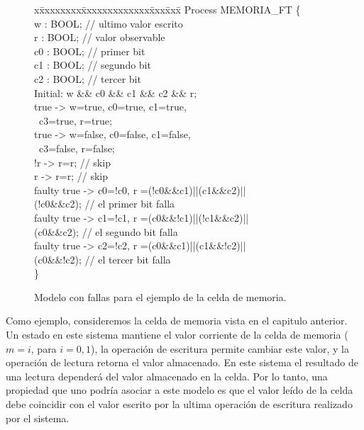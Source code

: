 \begin{figure}[t]
\centering
\begin{minipage}[t]{.47\textwidth}
\fontsize{10}{10}\selectfont\ttfamily
\begin{tabbing}
x\=xxxxxxxx\=xxxxxxxxxxxxx\=xxx\=xxx\= \kill    
Process MEMORIA\_FT \{\\[1ex]
\>w : BOOL; // ultimo valor escrito \\
\>r : BOOL; // valor observable \\
\>c0 : BOOL; // primer bit \\
\>c1 : BOOL; // segundo bit \\
\>c2 : BOOL; // tercer bit \\[1ex]
\>Initial: w \&\& c0 \&\& c1 \&\& c2 \&\& r;\\[1ex]
\>[write1]  true -> w=true, c0=true, c1=true,  \\
\>\>~c3=true, r=true; \>\> \\
\>[write0]  true -> w=false, c0=false, c1=false,  \\
\>\>~c3=false, r=false; \>\> \\
\>[read0]  !r -> r=r; // skip \\
\>[read1]  r ->  r=r; // skip \\
\>[fault1]  faulty true -> c0=!c0, r =(!c0\&\&c1)||(c1\&\&c2)|| \\ 
\>\>(!c0\&\&c2); // el primer bit falla  \\
\>[fault2]  faulty true -> c1=!c1, r =(c0\&\&!c1)||(!c1\&\&c2)|| \\ 
\>\>(c0\&\&c2); // el segundo bit falla  \\
\>[fault3]  faulty true -> c2=!c2, r =(c0\&\&c1)||(c1\&\&!c2)|| \\ 
\>\>(c0\&\&!c2); // el tercer bit falla  \\[1ex]
\}\\
\end{tabbing}
\end{minipage}
\caption{Modelo con fallas para el ejemplo de la celda de memoria.} \label{fig:exam_1_mem_cell_faulty}
\end{figure}

Como ejemplo, consideremos la celda de memoria vista en el capitulo anterior. 
Un estado en este sistema mantiene el valor corriente de la celda de memoria ($m=i$, para $i=0,1$), la operación de escritura permite cambiar este valor, y la operación de lectura retorna el valor almacenado.  
En este sistema el resultado de una lectura dependerá del valor almacenado en la celda. 
Por lo tanto, una propiedad que uno podría asociar a este modelo es que el valor leído de la celda debe coincidir con el valor escrito por la ultima operación de escritura realizado por el sistema. 
    
